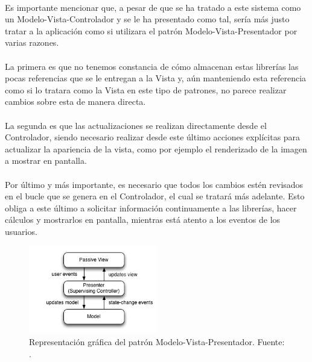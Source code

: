 \documentclass{subfiles}
\begin{document}
        \paragraph{}
        Es importante mencionar que, a pesar de que se ha tratado a este sistema como un Modelo-Vista-Controlador y se le ha presentado como tal, sería más justo tratar a la aplicación como si utilizara el patrón Modelo-Vista-Presentador \cite{web:mvp} por varias razones.

        \paragraph{}
        La primera es que no tenemos constancia de cómo almacenan estas librerías las pocas referencias que se le entregan a la Vista y, aún manteniendo esta referencia como si lo tratara como la Vista en este tipo de patrones, no parece realizar cambios sobre esta de manera directa.

        \paragraph{}
        La segunda es que las actualizaciones se realizan directamente desde el Controlador, siendo necesario realizar desde este último acciones explícitas para actualizar la apariencia de la vista, como por ejemplo el renderizado de la imagen a mostrar en pantalla.

        \paragraph{}
        Por último y más importante, es necesario que todos los cambios estén revisados en el bucle que se genera en el Controlador, el cual se tratará más adelante. Esto obliga a este último a solicitar información continuamente a las librerías, hacer cálculos y mostrarlos en pantalla, mientras está atento a los eventos de los usuarios.

        \begin{figure}
        \centering
        \includegraphics[width=0.5\textwidth]{img/mvp.png}
        \caption{Representación gráfica del patrón Modelo-Vista-Presentador. Fuente: .}
        \label{fig:mvp}
        \end{figure}
\end{document}
